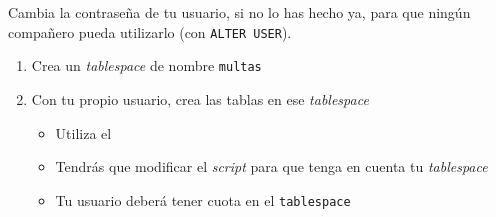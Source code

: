 \begin{homeworkProblem}
  Cambia la contraseña de tu usuario, si no lo has hecho ya, para que ningún compañero pueda utilizarlo (con \texttt{ALTER USER}).

  \begin{enumerate}
  \item Crea un \textit{tablespace} de nombre \texttt{multas}
  \item Con tu propio usuario, crea las tablas en ese \textit{tablespace}
    \begin{itemize}
    \item Utiliza el 
    \item Tendrás que modificar el \textit{script} para que tenga en cuenta tu \textit{tablespace}
    \item Tu usuario deberá tener cuota en el \texttt{tablespace}
    \end{itemize}
  \end{enumerate}
\end{homeworkProblem}

